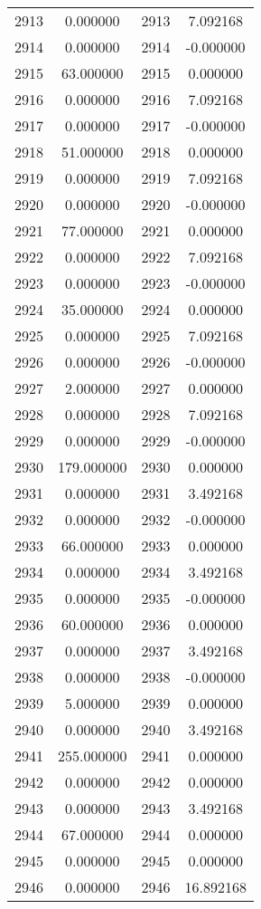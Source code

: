 \documentclass[12pt]{article}
\begin{document}
\begin{longtable}{@{}cccc@{}}
2913 & 0.000000 & 2913 & 7.092168 \\
2914 & 0.000000 & 2914 & -0.000000 \\
2915 & 63.000000 & 2915 & 0.000000 \\
2916 & 0.000000 & 2916 & 7.092168 \\
2917 & 0.000000 & 2917 & -0.000000 \\
2918 & 51.000000 & 2918 & 0.000000 \\
2919 & 0.000000 & 2919 & 7.092168 \\
2920 & 0.000000 & 2920 & -0.000000 \\
2921 & 77.000000 & 2921 & 0.000000 \\
2922 & 0.000000 & 2922 & 7.092168 \\
2923 & 0.000000 & 2923 & -0.000000 \\
2924 & 35.000000 & 2924 & 0.000000 \\
2925 & 0.000000 & 2925 & 7.092168 \\
2926 & 0.000000 & 2926 & -0.000000 \\
2927 & 2.000000 & 2927 & 0.000000 \\
2928 & 0.000000 & 2928 & 7.092168 \\
2929 & 0.000000 & 2929 & -0.000000 \\
2930 & 179.000000 & 2930 & 0.000000 \\
2931 & 0.000000 & 2931 & 3.492168 \\
2932 & 0.000000 & 2932 & -0.000000 \\
2933 & 66.000000 & 2933 & 0.000000 \\
2934 & 0.000000 & 2934 & 3.492168 \\
2935 & 0.000000 & 2935 & -0.000000 \\
2936 & 60.000000 & 2936 & 0.000000 \\
2937 & 0.000000 & 2937 & 3.492168 \\
2938 & 0.000000 & 2938 & -0.000000 \\
2939 & 5.000000 & 2939 & 0.000000 \\
2940 & 0.000000 & 2940 & 3.492168 \\
2941 & 255.000000 & 2941 & 0.000000 \\
2942 & 0.000000 & 2942 & 0.000000 \\
2943 & 0.000000 & 2943 & 3.492168 \\
2944 & 67.000000 & 2944 & 0.000000 \\
2945 & 0.000000 & 2945 & 0.000000 \\
2946 & 0.000000 & 2946 & 16.892168 \\

\end{longtable}
\end{document}
